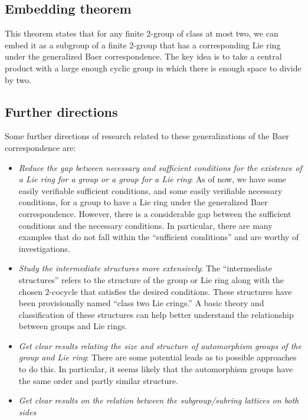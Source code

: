 \documentclass[10pt]{amsart}
\begin{document}
\subsection*{Embedding theorem}

This theorem states that for any finite $2$-group of class at most
two, we can embed it as a subgroup of a finite $2$-group that has a
corresponding Lie ring under the generalized Baer correspondence. The
key idea is to take a central product with a large enough cyclic group
in which there is enough space to divide by two.


\subsection*{Further directions}

Some further directions of research related to these generalizations
of the Baer correspondence are:

\begin{itemize}
\item {\em Reduce the gap between necessary and sufficient conditions
  for the existence of a Lie ring for a group or a group for a Lie
  ring}: As of now, we have some easily verifiable sufficient
  conditions, and some easily verifiable necessary conditions, for a
  group to have a Lie ring under the generalized Baer
  correspondence. However, there is a considerable gap between the
  sufficient conditions and the necessary conditions. In particular,
  there are many examples that do not fall within the ``sufficient
  conditions'' and are worthy of investigations.
\item {\em Study the intermediate structures more extensively}: The
  ``intermediate structures'' refers to the structure of the group or
  Lie ring along with the chosen $2$-cocycle that satisfies the
  desired conditions. These structures have been provisionally named
  ``class two Lie crings.'' A basic theory and classification of these
  structures can help better understand the relationship between
  groups and Lie rings.
\item {\em Get clear results relating the size and structure of
  automorphism groups of the group and Lie ring}: There are some
  potential leads as to possible approaches to do this. In particular,
  it seems likely that the automorphism groups have the same order and
  partly similar structure.
\item {\em Get clear results on the relation between the
  subgroup/subring lattices on both sides}
\end{itemize}
\end{document}
